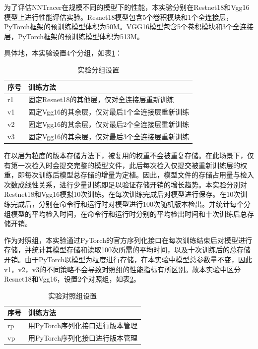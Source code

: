 \documentclass{cjc}
\begin{document}
为了评估NNTracer在规模不同的模型下的性能，本实验分别在Restnet18和Vgg16模型上进行性能评估实验。Resnet18模型包含5个卷积模块和1个全连接层，PyTorch框架的预训练模型体积为50M。VGG16模型包含5个卷积模块和3个全连接层，PyTorch框架的预训练模型体积为513M。

具体地，本实验设置4个分组，如表\ref{expgroup}：
\begin{table}
\caption{实验分组设置}
\label{expgroup}
\begin{center}
 \begin{tabular}{| m{1cm} | m{6cm} |} 
 \hline
 序号 & 训练方法 \\ 
 \hline\hline
 r1 & 固定Resnet18的其他层，仅对全连接层重新训练 \\ 
 \hline
 v1 & 固定Vgg16的其余层，仅对最后1个全连接层重新训练 \\
 \hline
 v2 & 固定Vgg16的其余层，仅对最后2个全连接层重新训练\\
 \hline
 v3 & 固定Vgg16的其余层，仅对最后3个全连接层重新训练  \\ 
 \hline
\end{tabular}
\end{center}
\end{table}

在以层为粒度的版本存储方法下，被复用的权重不会被重复存储。在此场景下，仅有第一次检入时会提交完整的模型文件，此后每次检入仅提交被重新训练层的权重，即每次训练后模型总存储的增量为定植。因此，模型文件的存储占用量与检入次数成线性关系，进行少量训练即足以验证存储开销的增长趋势。本实验分别对Restnet18和Vgg16模拟10次训练。在每次训练完成后对模型进行保存。在10次训练完成后，分别在命令行和运行时对模型进行100次随机版本检出。并统计每个分组模型的平均检入时间，在命令行和运行时分别的平均检出时间和十次训练后总存储开销。

作为对照组，本实验通过PyTorch的官方序列化接口在每次训练结束后对模型进行存储，并统计其模型存储和读取100次所需的平均时间，以及十次训练后的总存储开销。由于PyTorch以模型为粒度进行存储，在本实验中模型总参数量不变，因此v1，v2，v3的不同策略不会导致对照组的性能指标有所区别。故本实验中区分Resnet18和Vgg16，设置2个对照组，如表\ref{refgroup}。
\begin{table}
\caption{实验对照组设置}
\label{refgroup}
\begin{center}
 \begin{tabular}{| m{1cm} | m{6cm} |} 
 \hline
 序号 & 训练方法 \\ 
 \hline\hline
 rp & 用PyTorch序列化接口进行版本管理 \\ 
 \hline
 vp & 用PyTorch序列化接口进行版本管理 \\
 \hline
\end{tabular}
\end{center}
\end{table}
\end{document}
